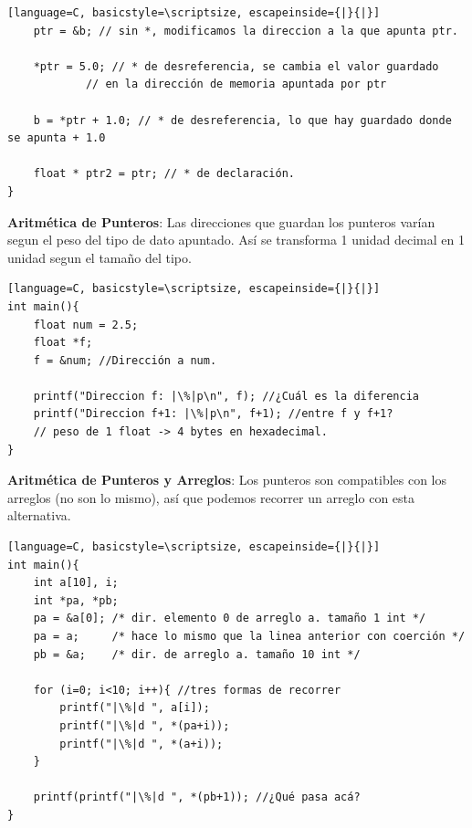 \documentclass{article}
\begin{document}
\begin{itemize}
\begin{minipage}[h]{0.45\textwidth}
\begin{lstlisting}[language=C, basicstyle=\scriptsize, escapeinside={|}{|}]
	ptr = &b; // sin *, modificamos la direccion a la que apunta ptr. 
	
	*ptr = 5.0; // * de desreferencia, se cambia el valor guardado 
		    // en la dirección de memoria apuntada por ptr
	
	b = *ptr + 1.0; // * de desreferencia, lo que hay guardado donde se apunta + 1.0 
	
	float * ptr2 = ptr; // * de declaración. 
}
\end{lstlisting}

\end{minipage}
\hspace{0.5cm}
\begin{minipage}[h]{0.45\textwidth}
\item \textbf{Aritmética de Punteros}: Las direcciones que guardan los punteros varían segun el peso del tipo de dato apuntado. Así se transforma 1 unidad decimal en 1 unidad segun el tamaño del tipo.
\begin{lstlisting}[language=C, basicstyle=\scriptsize, escapeinside={|}{|}]
int main(){
	float num = 2.5;
	float *f;
	f = &num; //Dirección a num.

	printf("Direccion f: |\%|p\n", f); //¿Cuál es la diferencia
	printf("Direccion f+1: |\%|p\n", f+1); //entre f y f+1?
	// peso de 1 float -> 4 bytes en hexadecimal. 
}
\end{lstlisting}
\end{minipage}

\begin{minipage}[h]{0.45\textwidth}
\item \textbf{Aritmética de Punteros y Arreglos}: Los punteros son compatibles con los arreglos (no son lo mismo), así que podemos recorrer un arreglo con esta alternativa. 
\begin{lstlisting}[language=C, basicstyle=\scriptsize, escapeinside={|}{|}]
int main(){
	int a[10], i;
	int *pa, *pb;
	pa = &a[0]; /* dir. elemento 0 de arreglo a. tamaño 1 int */
	pa = a;	    /* hace lo mismo que la linea anterior con coerción */
	pb = &a;    /* dir. de arreglo a. tamaño 10 int */
	
	for (i=0; i<10; i++){ //tres formas de recorrer
		printf("|\%|d ", a[i]);
		printf("|\%|d ", *(pa+i));
		printf("|\%|d ", *(a+i));
	}
	
	printf(printf("|\%|d ", *(pb+1)); //¿Qué pasa acá?
}
\end{lstlisting}

\end{minipage}



\end{itemize}
\end{document}
